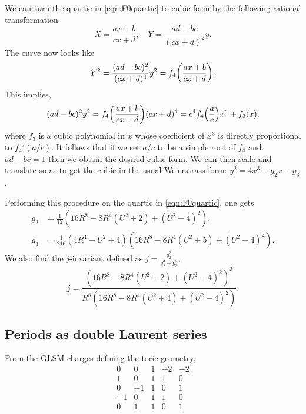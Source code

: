 \documentclass[11pt, a4paper]{article}
\numberwithin{equation}{section}
\begin{document}
We can turn the quartic in \cref{eqn:F0quartic} to cubic form by the following rational transformation
\begin{equation}
  X = \frac{a x + b}{c x + d}, \quad Y = \frac{a d - b c}{(c x + d)^2} y.
\end{equation}
The curve now looks like
\begin{equation}
  Y^2 = \frac{(a d - b c)^2}{(c x + d)^4} y^2 = f_4\qty(\frac{a x + b}{c x + d}).
\end{equation}
This implies,
\begin{equation}
  (a d - b c)^2 y^2 = f_4\qty(\frac{a x + b}{c x + d})(c x + d)^4 = c^4 f_4\qty(\frac{a}{c}) x^4 + f_3(x),
\end{equation}
where $f_3$ is a cubic polynomial in $x$ whose coefficient of $x^3$ is directly proportional to $f_4'(a/c)$. It follows that if we set $a/c$ to be a simple root of $f_4$ and $a d - b c = 1$ then we obtain the desired cubic form. We can then scale and translate so as to get the cubic in the usual Weierstrass form: $y^2 = 4 x^3 - g_2 x - g_3$.

Performing this procedure on the quartic in \cref{eqn:F0quartic}, one gets
\begin{equation}
  \begin{aligned}
    g_2 &= \frac{1}{12} \left(16 R^8-8 R^4 \left(U^2+2\right)+\left(U^2-4\right)^2\right), \\
    g_3 &= \frac{1}{216} \left(4 R^4-U^2+4\right) \left(16 R^8-8 R^4 \left(U^2+5\right)+\left(U^2-4\right)^2\right).
  \end{aligned}
\end{equation}
We also find the $j$-invariant defined as $j = \frac{g_2^3}{g_2^3 - g_3^2}$,
\begin{equation}
  j = \frac{\left(16 R^8-8 R^4 \left(U^2+2\right)+\left(U^2-4\right)^2\right)^3}{R^8 \left(16 R^8-8 R^4 \left(U^2+4\right)+\left(U^2-4\right)^2\right)}.
\end{equation}

\subsection{Periods as double Laurent series}
From the GLSM charges defining the toric geometry, 
\begin{equation}
    \begin{array}{ccc|cc} 
    0 & 0 & 1 & -2 & -2 \\
    1 & 0 & 1 & 1 & 0 \\
    0 & -1 & 1 & 0 &1 \\
   -1 & 0 & 1 & 1 & 0 \\
   0  & 1 & 1 & 0 & 1 \\
   \end{array}
\end{equation}
\end{document}
